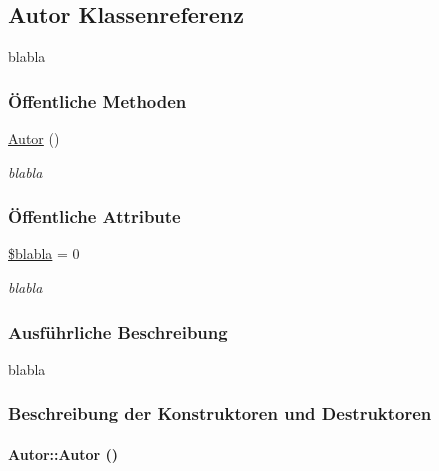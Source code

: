 \hypertarget{classAutor}{
\subsection{Autor Klassenreferenz}
\label{classAutor}
}
blabla  


\subsubsection*{\"{O}ffentliche Methoden}
\begin{CompactItemize}
\item 
\hyperlink{classAutor_28111338918ed4358ca4adc2cc694b23}{Autor} ()
\begin{CompactList}\small\item\em blabla \item\end{CompactList}\end{CompactItemize}
\subsubsection*{\"{O}ffentliche Attribute}
\begin{CompactItemize}
\item 
\hyperlink{classAutor_2dc163422acc9a6161ae97d2301ddba0}{\$blabla} = 0
\begin{CompactList}\small\item\em blabla \item\end{CompactList}\end{CompactItemize}


\subsubsection{Ausf\"{u}hrliche Beschreibung}
blabla 



\subsubsection{Beschreibung der Konstruktoren und Destruktoren}
\hypertarget{classAutor_28111338918ed4358ca4adc2cc694b23}{
\paragraph[Autor]{\setlength{\rightskip}{0pt plus 5cm}Autor::Autor ()}\hfill}
\label{classAutor_28111338918ed4358ca4adc2cc694b23}


